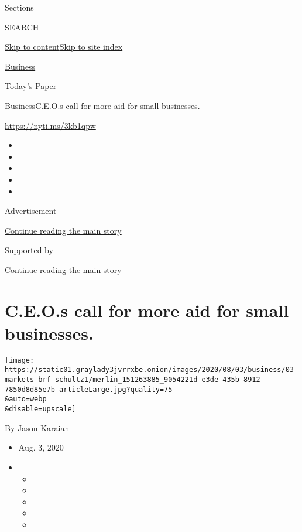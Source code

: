 Sections

SEARCH

\protect\hyperlink{site-content}{Skip to
content}\protect\hyperlink{site-index}{Skip to site index}

\href{https://www.nytimes3xbfgragh.onion/section/business}{Business}

\href{https://myaccount.nytimes3xbfgragh.onion/auth/login?response_type=cookie\&client_id=vi}{}

\href{https://www.nytimes3xbfgragh.onion/section/todayspaper}{Today's
Paper}

\href{/section/business}{Business}\textbar{}C.E.O.s call for more aid
for small businesses.

\url{https://nyti.ms/3kb1qpw}

\begin{itemize}
\item
\item
\item
\item
\item
\end{itemize}

Advertisement

\protect\hyperlink{after-top}{Continue reading the main story}

Supported by

\protect\hyperlink{after-sponsor}{Continue reading the main story}

\hypertarget{ceos-call-for-more-aid-for-small-businesses}{%
\section{C.E.O.s call for more aid for small
businesses.}\label{ceos-call-for-more-aid-for-small-businesses}}

\texttt{[image: https://static01.graylady3jvrrxbe.onion/images/2020/08/03/business/03-markets-brf-schultz1/merlin\_151263885\_9054221d-e3de-435b-8912-7850d8d85e7b-articleLarge.jpg?quality=75\\\&auto=webp\\\&disable=upscale]}

By \href{https://www.nytimes3xbfgragh.onion/by/jason-karaian}{Jason
Karaian}

\begin{itemize}
\item
  Aug. 3, 2020
\item
  \begin{itemize}
  \item
  \item
  \item
  \item
  \item
  \end{itemize}
\end{itemize}

